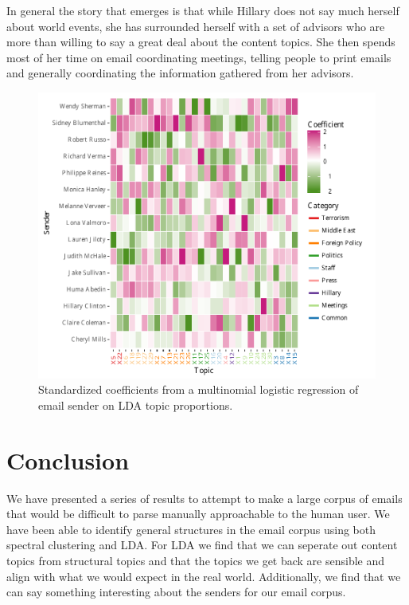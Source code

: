 \documentclass[12pt]{article}
\theoremstyle{definition}
\theoremstyle{algodesc}
\begin{document}
In general the story that emerges is that while Hillary does not say much herself about world events, she has surrounded herself with a set of advisors who are more than willing to say a great deal about the content topics.  She then spends most of her time on email coordinating meetings, telling people to print emails and generally coordinating the information gathered from her advisors.

\begin{figure}[htb] \centering
  \includegraphics[width=0.95\linewidth]{../images/coefficients.pdf}
  \caption{Standardized coefficients from a multinomial logistic regression of email sender on LDA topic proportions.}
  \label{fig:coefficients}
\end{figure}


\section{Conclusion}

We have presented a series of results to attempt to make a large corpus of emails that would be difficult to parse manually approachable to the human user.  We have been able to identify general structures in the email corpus using both spectral clustering and LDA.  For LDA we find that we can seperate out content topics from structural topics and that the topics we get back are sensible and align with what we would expect in the real world.  Additionally, we find that we can say something interesting about the senders for our email corpus.
\end{document}
